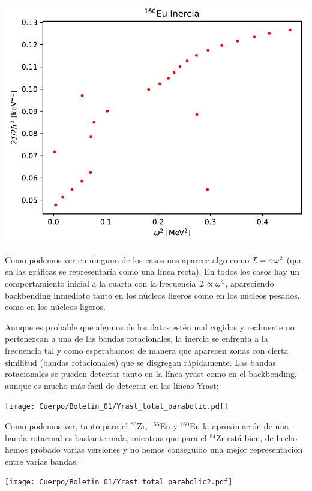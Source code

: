 \begin{texercise}
\begin{center}
        \includegraphics[width=0.6\linewidth]{Cuerpo/Boletin_01/160Eu_inercia.pdf}
    \end{center}
    Como podemos ver en ninguno de los casos nos aparece algo como $\mathcal{I} = \alpha \omega^2$ (que en las gráficas se representaría como una línea recta). En todos los casos hay un comportamiento  inicial a la cuarta con la frecuencia $\mathcal{I} \propto \omega^4$, apareciendo backbending inmediato tanto en los núcleos ligeros como en los núcleos pesados, como en los núcleos ligeros.

    Aunque es probable que algunos de los datos estén mal cogidos y realmente no pertenezcan a una de las bandas rotacionales, la inercia se enfrenta a la frecuencia tal y como esperabamos: de manera que aparecen zonas con cierta similitud (bandas rotacionales) que se disgregan rápidamente. Las bandas rotacionales se pueden detectar tanto en la línea yrast como en el backbending, aunque es mucho más facil de detectar en las líneas Yrast:


    \begin{center}
        \texttt{[image: Cuerpo/Boletin\_01/Yrast\_total\_parabolic.pdf]}
    \end{center}

    Como podemos ver, tanto para el $^{86}$Zr, $^{156}$Eu y $^{160}$Eu la aproximación de una banda rotacinal es bastante mala, mientras que para el $^{84}$Zr está bien, de hecho hemos probado varias versiones y no hemos conseguido una mejor representación entre varias bandas.

    \begin{center}
        \texttt{[image: Cuerpo/Boletin\_01/Yrast\_total\_parabolic2.pdf]}
    \end{center}






\end{texercise}


